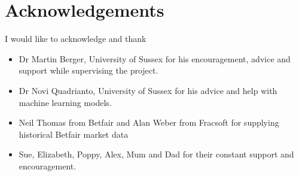 \chapter{Acknowledgements}

I would like to acknowledge and thank 

	\begin{itemize}
		\item Dr Martin Berger, University of Sussex for his encouragement, advice and support while supervising the project.
		\item Dr Novi Quadrianto, University of Sussex for his advice and help with machine learning models.
		\item Neil Thomas from Betfair and Alan Weber from Fracsoft for supplying historical Betfair market data
		\item Sue, Elizabeth, Poppy, Alex, Mum and Dad for their constant support and encouragement.
	\end{itemize} 

